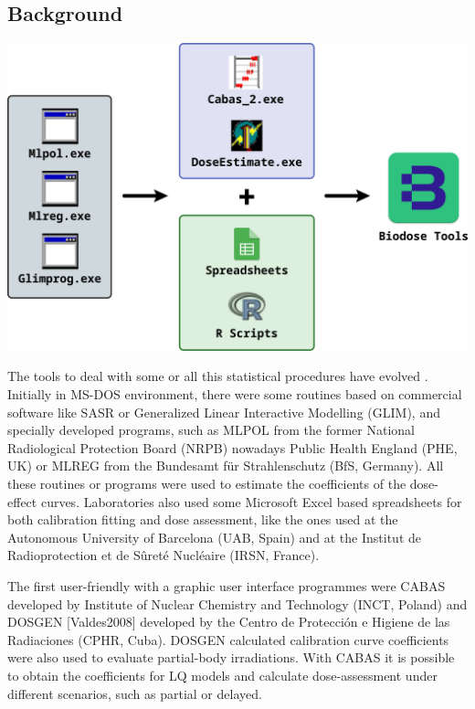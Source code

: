 \documentclass[]{scrartcl}
\begin{document}
\hypertarget{intro-background}{%
\subsection{Background}\label{intro-background}}

\begin{center}\includegraphics[width=0.75\linewidth]{images/intro/chronology} \end{center}

The tools to deal with some or all this statistical procedures have evolved \citep{Ainsbury2009}. Initially in MS-DOS environment, there were some routines based on commercial software like SASR or Generalized Linear Interactive Modelling (GLIM), and specially developed programs, such as MLPOL from the former National Radiological Protection Board (NRPB) nowadays Public Health England (PHE, UK) or MLREG from the Bundesamt für Strahlenschutz (BfS, Germany). All these routines or programs were used to estimate the coefficients of the dose-effect curves. Laboratories also used some Microsoft Excel based spreadsheets for both calibration fitting and dose assessment, like the ones used at the Autonomous University of Barcelona (UAB, Spain) and at the Institut de Radioprotection et de Sûreté Nucléaire (IRSN, France).

The first user-friendly with a graphic user interface programmes were CABAS \citep{Deperas2007} developed by Institute of Nuclear Chemistry and Technology (INCT, Poland) and DOSGEN {[}Valdes2008{]} developed by the Centro de Protección e Higiene de las Radiaciones (CPHR, Cuba). DOSGEN calculated calibration curve coefficients were also used to evaluate partial-body irradiations. With CABAS it is possible to obtain the coefficients for LQ models and calculate dose-assessment under different scenarios, such as partial or delayed.
\end{document}
